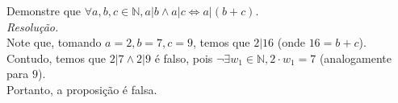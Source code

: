 Demonstre que $\forall a, b, c \in \mathbb{N}, a | b \land a | c \iff a | (b + c)$. \\
\emph{Resolução.} \\
Note que, tomando $a = 2, b = 7, c = 9$, temos que $2 | 16$ (onde $16 = b + c$). \\
Contudo, temos que $2 | 7 \land 2 | 9$ é falso, pois $\lnot \exists w_1 \in \mathbb{N}, 2 \cdot w_1 = 7$ (analogamente para $9$). \\
Portanto, a proposição é falsa.